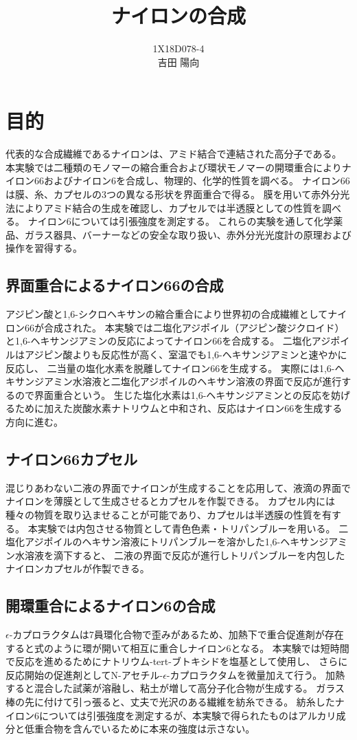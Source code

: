 \documentclass[11pt]{jsarticle}
\begin{document}
\title{ナイロンの合成}
\author{1X18D078-4 \\ 吉田 陽向}
\maketitle
\newpage
\section{目的}
代表的な合成繊維であるナイロンは、アミド結合で連結された高分子である。
本実験では二種類のモノマーの縮合重合および環状モノマーの開環重合によりナイロン66およびナイロン6を合成し、物理的、化学的性質を調べる。
ナイロン66は膜、糸、カプセルの3つの異なる形状を界面重合で得る。
膜を用いて赤外分光法によりアミド結合の生成を確認し、カプセルでは半透膜としての性質を調べる。
ナイロン6については引張強度を測定する。
これらの実験を通して化学薬品、ガラス器具、バーナーなどの安全な取り扱い、赤外分光光度計の原理および操作を習得する。
\subsection{界面重合によるナイロン66の合成}
アジピン酸と1,6-シクロヘキサンの縮合重合により世界初の合成繊維としてナイロン66が合成された。
本実験では二塩化アジポイル（アジピン酸ジクロイド）と1,6-ヘキサンジアミンの反応によってナイロン66を合成する。
二塩化アジポイルはアジピン酸よりも反応性が高く、室温でも1,6-ヘキサンジアミンと速やかに反応し、
二当量の塩化水素を脱離してナイロン66を生成する。
実際には1,6-ヘキサンジアミン水溶液と二塩化アジポイルのヘキサン溶液の界面で反応が進行するので界面重合という。
生じた塩化水素は1,6-ヘキサンジアミンとの反応を妨げるために加えた炭酸水素ナトリウムと中和され、反応はナイロン66を生成する方向に進む。
\subsection{ナイロン66カプセル}
混じりあわない二液の界面でナイロンが生成することを応用して、液滴の界面でナイロンを薄膜として生成させるとカプセルを作製できる。
カプセル内には種々の物質を取り込ませることが可能であり、カプセルは半透膜の性質を有する。
本実験では内包させる物質として青色色素・トリパンブルーを用いる。
二塩化アジポイルのヘキサン溶液にトリパンブルーを溶かした1,6-ヘキサンジアミン水溶液を滴下すると、
二液の界面で反応が進行しトリパンブルーを内包したナイロンカプセルが作製できる。
\subsection{開環重合によるナイロン6の合成}
$\epsilon$-カプロラクタムは7員環化合物で歪みがあるため、加熱下で重合促進剤が存在すると式のように環が開いて相互に重合しナイロン6となる。
本実験では短時間で反応を進めるためにナトリウム-tert-ブトキシドを塩基として使用し、
さらに反応開始の促進剤としてN-アセチル-$\epsilon$-カプロラクタムを微量加えて行う。
加熱すると混合した試薬が溶融し、粘土が増して高分子化合物が生成する。
ガラス棒の先に付けて引っ張ると、丈夫で光沢のある繊維を紡糸できる。
紡糸したナイロン6については引張強度を測定するが、本実験で得られたものはアルカリ成分と低重合物を含んでいるために本来の強度は示さない。
\end{document}

